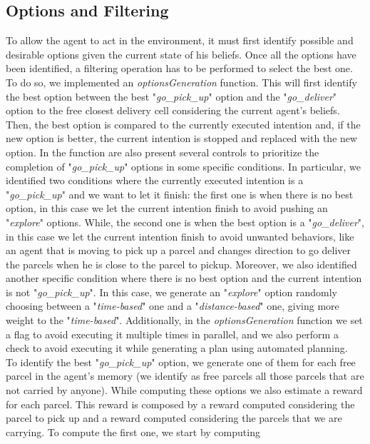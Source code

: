    \subsection{Options and Filtering}
        To allow the agent to act in the environment, it must first identify possible and desirable options given the current state of his beliefs. Once all the options have been identified, a filtering operation has to be performed to select the best one.
        \medskip\\
        To do so, we implemented an \textit{optionsGeneration} function. This will first identify the best option between the best "\textit{go\_pick\_up}" option and the "\textit{go\_deliver}" option to the free closest delivery cell considering the current agent's beliefs. Then, the best option is compared to the currently executed intention and, if the new option is better, the current intention is stopped and replaced with the new option. In the function are also present several controls to prioritize the completion of "\textit{go\_pick\_up}" options in some specific conditions. In particular, we identified two conditions where the currently executed intention is a "\textit{go\_pick\_up}" and we want to let it finish: the first one is when there is no best option, in this case we let the current intention finish to avoid pushing an "\textit{explore}" options. While, the second one is when the best option is a "\textit{go\_deliver}", in this case we let the current intention finish to avoid unwanted behaviors, like an agent that is moving to pick up a parcel and changes direction to go deliver the parcels when he is close to the parcel to pickup. Moreover, we also identified another specific condition where there is no best option and the current intention is not "\textit{go\_pick\_up}". In this case, we generate an "\textit{explore}" option randomly choosing between a "\textit{time-based}" one and a "\textit{distance-based}" one, giving more weight to the "\textit{time-based}". Additionally, in the \textit{optionsGeneration} function we set a flag to avoid executing it multiple times in parallel, and we also perform a check to avoid executing it while generating a plan using automated planning.
        \medskip\\
        To identify the best "\textit{go\_pick\_up}" option, we generate one of them for each free parcel in the agent's memory (we identify as free parcels all those parcels that are not carried by anyone). While computing these options we also estimate a reward for each parcel. This reward is composed by a reward computed considering the parcel to pick up and a reward computed considering the parcels that we are carrying. To compute the first one, we start by computing 

